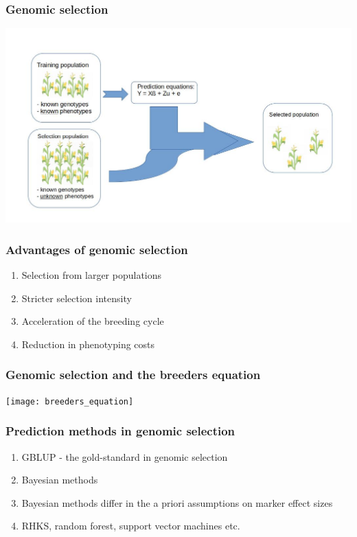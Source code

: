 \documentclass{beamer}
\begin{document}
\begin{frame}
  \frametitle{Genomic selection}
  \includegraphics[height=.8\textheight,width=.9\textwidth]{gs}
\end{frame}

\begin{frame}
  \frametitle{Advantages of genomic selection}
  \begin{enumerate}[<+->]
  \item Selection from larger populations
  \item Stricter selection intensity 
  \item Acceleration of the breeding cycle
  \item Reduction in phenotyping costs
  \end{enumerate}
\end{frame}

\begin{frame}
  \frametitle{Genomic selection and the breeders equation}
  \texttt{[image: breeders\_equation]}
\end{frame}


\begin{frame}
  \frametitle{Prediction methods in genomic selection}
  \begin{enumerate}[<+->]
  \item GBLUP - the gold-standard in genomic selection
  \item Bayesian methods
  \item Bayesian methods differ in the a priori assumptions on marker effect sizes
  \item RHKS, random forest, support vector machines etc.
  \end{enumerate}    
\end{frame}
 
\end{document}
